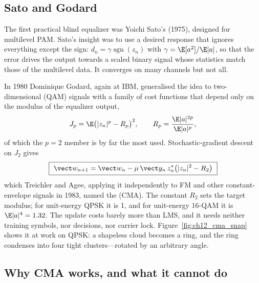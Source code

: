 \subsection{Sato and Godard}

The first practical blind equalizer was Yoichi Sato's (1975), designed for multilevel PAM. Sato's
insight was to use a desired response that ignores everything except the sign:
$d_n=\gamma\operatorname{sgn}(z_n)$ with $\gamma=\E[a^2]/\E|a|$, so that the error drives the
output towards a scaled binary signal whose statistics match those of the multilevel data. It
converges on many channels but not all.

In 1980 Dominique Godard, again at IBM, generalised the idea to two-dimensional (QAM) signals with
a family of cost functions that depend only on the modulus of the equalizer output,
\begin{equation}
J_p=\E\big(|z_n|^p-R_p\big)^2,\qquad R_p=\frac{\E|a|^{2p}}{\E|a|^p},
\label{eq:ch12:godard}
\end{equation}
of which the $p=2$ member is by far the most used. Stochastic-gradient descent on $J_2$ gives
\begin{equation}
\boxed{\ \vect w_{n+1}=\vect w_n-\mu\,\vect y_n\,z_n^*\big(|z_n|^2-R_2\big)\ }
\label{eq:ch12:cma}
\end{equation}
which Treichler and Agee, applying it independently to FM and other constant-envelope signals in
1983, named the  (CMA). The constant $R_2$ sets the target modulus;
for unit-energy QPSK it is 1, and for unit-energy 16-QAM it is $\E|a|^4=1.32$. The update costs
barely more than LMS, and it needs neither training symbols, nor decisions, nor carrier lock.
Figure~\ref{fig:ch12_cma_snap} shows it at work on QPSK: a shapeless cloud becomes a ring, and the
ring condenses into four tight clusters---rotated by an arbitrary angle.


\subsection{Why CMA works, and what it cannot do}

